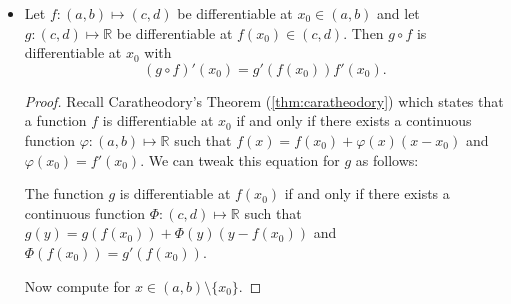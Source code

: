 \documentclass{article}
\newcommand{\R}{\mathbb{R}}
\newcommand{\?}{\stackrel{?}{=}}
\theoremstyle{definition} %
\begin{document}
\begin{itemize}
\begin{proof}
\begin{align*}
            \lim_{x \to x_0} \frac{\frac{1}{f}(x) - \frac{1}{f}(x_0)}{x - x_0} &= \lim_{x \to x_0} \frac{\frac{1}{f(x)} - \frac{1}{f(x_0)}}{x - x_0} \\
            &= \lim_{x \to x_0} \frac{\frac{f(x) - f(x_0)}{f(x) \cdot f(x_0)}}{x - x_0} \\
            &= \lim_{x \to x_0} \left[- \frac{f(x) - f(x_0)}{x - x_0} \cdot \frac{1}{f(x) \cdot f(x_0)}\right] \\
            &= - \lim_{x \to x_0} \frac{f(x) - f(x_0)}{x - x_0} \cdot \lim_{x \to x_0} \frac{1}{f(x) \cdot f(x_0)} \\
            &= -f'(x_0) \cdot \frac{1}{(f(x_0))^2} \\
            &= \frac{-f'(x_0)}{(f(x_0)^2)}.
        \end{align*}
        For the second part, we note that $\nicefrac{f}{g} = f \cdot \nicefrac{1}{g}$ and compute
        \begin{align*}
            \left(\frac{f}{g}\right)'(x_0) &= \underbrace{f'(x_0) \cdot \frac{1}{g(x_0)} + f(x_0) \cdot \left(\frac{-g'(x_0)}{(g(x_0))^2}\right)}_{\text{product rule + quotient rule}} \\
            &= \frac{f'(x_0)g(x_0) + f(x_0)g'(x_0)}{(g(x_0))^2}.
        \end{align*}
    \end{proof}
    \item[]
    \begin{proposition}
        Let $f: (a, b) \mapsto (c, d)$ be differentiable at $x_0 \in (a, b)$ and let $g: (c, d) \mapsto \R$ be differentiable at $f(x_0) \in (c, d)$. Then $g \circ f$ is differentiable at $x_0$ with
        $$(g \circ f)'(x_0) = g'(f(x_0))f'(x_0).$$
    \end{proposition}
    \begin{proof}
        Recall Caratheodory's Theorem (\ref{thm:caratheodory}) which states that a function $f$ is differentiable at $x_0$ if and only if there exists a continuous function $\varphi: (a, b) \mapsto \R$ such that $f(x) = f(x_0) + \varphi(x)(x - x_0)$ and $\varphi(x_0) = f'(x_0)$. We can tweak this equation for $g$ as follows: 
        \begin{center}
            The function $g$ is differentiable at $f(x_0)$ if and only if there exists a continuous function $\Phi: (c, d) \mapsto \R$ such that $g(y) = g(f(x_0)) + \Phi(y)(y - f(x_0))$ and $\Phi(f(x_0)) = g'(f(x_0))$.
        \end{center}
        Now compute for $x \in (a, b) \setminus \{x_0\}$.

\end{proof}
\end{itemize}
\end{document}

